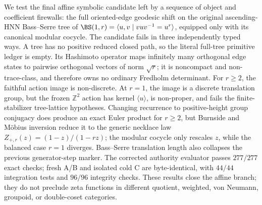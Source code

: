 We test the final affine symbolic candidate left by a sequence of object and
coefficient firewalls: the full oriented-edge geodesic shift on the original
ascending-HNN Bass--Serre tree of
$\BS(1,r)=\langle u,v\mid vuv^{-1}=u^r\rangle$, equipped only with its
canonical modular cocycle.  The candidate fails in three independently typed
ways.  A tree has no positive reduced closed path, so the literal full-tree
primitive ledger is empty.  Its Hashimoto operator maps infinitely many
orthogonal edge states to pairwise orthogonal vectors of norm $\sqrt r$; it is
noncompact and non-trace-class, and therefore owns no ordinary Fredholm
determinant.  For $r\ge2$, the faithful action image is non-discrete.  At
$r=1$, the image is a discrete translation group, but the frozen
$\mathbb Z^2$ action has kernel $\langle u\rangle$, is non-proper, and fails
the finite-stabilizer tree-lattice hypotheses.
Changing recurrence to positive-height group conjugacy does produce an exact
Euler product for $r\ge2$, but Burnside and M\"obius inversion reduce it to the
generic necklace law
$Z_{+,r}(z)=(1-z)/(1-rz)$; the modular cocycle only rescales $z$, while the
balanced case $r=1$ diverges.  Bass--Serre translation length also collapses
the previous generator-step marker.  The corrected authority evaluator
passes $277/277$ exact checks; fresh A/B and isolated cold C are byte-identical,
with $44/44$ integration tests and $96/96$ integrity checks.  These results
close the affine branch; they do not preclude zeta functions in different
quotient, weighted, von Neumann, groupoid, or double-coset categories.
